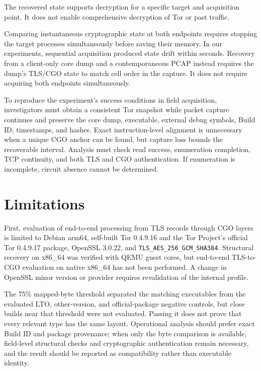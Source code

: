 \documentclass[10pt,a4paper]{article}
\newcommand{\code}[1]{\nolinkurl{#1}}
\begin{document}
The recovered state supports decryption for a specific target and acquisition point. It does not enable comprehensive decryption of Tor or past traffic.


Comparing instantaneous cryptographic state at both endpoints requires stopping the target processes simultaneously before saving their memory. In our experiments, sequential acquisition produced state drift within seconds.
Recovery from a client-only core dump and a contemporaneous PCAP instead requires the dump's TLS/CGO state to match cell order in the capture. It does not require acquiring both endpoints simultaneously.

To reproduce the experiment's success conditions in field acquisition, investigators must obtain a consistent Tor snapshot while packet capture continues and preserve the core dump, executable, external debug symbols, Build ID, timestamps, and hashes. Exact instruction-level alignment is unnecessary when a unique CGO anchor can be found, but capture loss bounds the recoverable interval. Analysis must check read success, enumeration completion, TCP continuity, and both TLS and CGO authentication. If enumeration is incomplete, circuit absence cannot be determined.

\section{Limitations}\label{sec:limitations}

First, evaluation of end-to-end processing from TLS records through CGO layers is limited to Debian arm64, self-built Tor 0.4.9.16 and the Tor Project's official Tor 0.4.9.17 package, OpenSSL 3.0.22, and \code{TLS_AES_256_GCM_SHA384}. Structural recovery on x86\_64 was verified with QEMU guest cores, but end-to-end TLS-to-CGO evaluation on native x86\_64 has not been performed. A change in OpenSSL minor version or provider requires revalidation of the internal profile.

The 75\% mapped-byte threshold separated the matching executables from the evaluated LTO, other-version, and official-package negative controls, but close builds near that threshold were not evaluated. Passing it does not prove that every relevant type has the same layout. Operational analysis should prefer exact Build ID and package provenance; when only the byte comparison is available, field-level structural checks and cryptographic authentication remain necessary, and the result should be reported as compatibility rather than executable identity.
\end{document}
